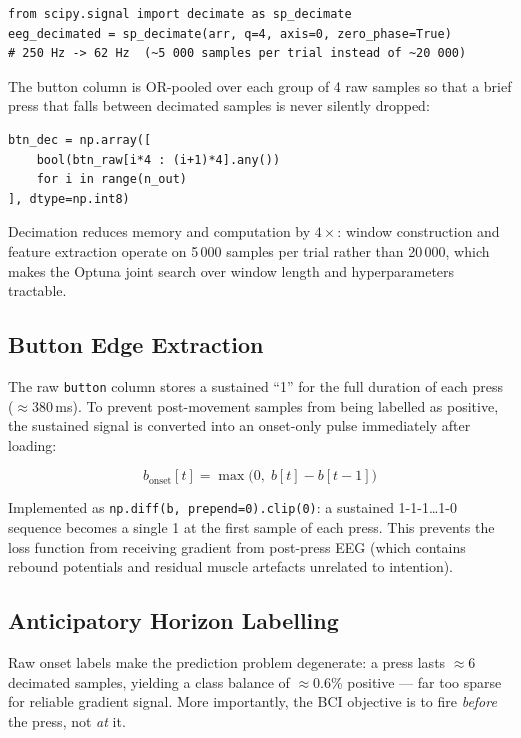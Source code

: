 \documentclass[12pt,a4paper]{article}
\begin{document}
\begin{lstlisting}[style=pycode]
from scipy.signal import decimate as sp_decimate
eeg_decimated = sp_decimate(arr, q=4, axis=0, zero_phase=True)
# 250 Hz -> 62 Hz  (~5 000 samples per trial instead of ~20 000)
\end{lstlisting}

The button column is OR-pooled over each group of 4 raw samples so that a
brief press that falls between decimated samples is never silently dropped:

\begin{lstlisting}[style=pycode]
btn_dec = np.array([
    bool(btn_raw[i*4 : (i+1)*4].any())
    for i in range(n_out)
], dtype=np.int8)
\end{lstlisting}

Decimation reduces memory and computation by $4\times$: window construction
and feature extraction operate on 5\,000 samples per trial rather than
20\,000, which makes the Optuna joint search over window length and
hyperparameters tractable.

\subsection{Button Edge Extraction}

The raw \texttt{button} column stores a sustained ``1'' for the full
duration of each press ($\approx$380\,ms). To prevent post-movement samples
from being labelled as positive, the sustained signal is converted into an
onset-only pulse immediately after loading:

\[
  b_{\text{onset}}[t] = \max\!\bigl(0,\; b[t] - b[t-1]\bigr)
\]

Implemented as \texttt{np.diff(b, prepend=0).clip(0)}: a sustained
1-1-1\ldots1-0 sequence becomes a single 1 at the first sample of each
press. This prevents the loss function from receiving gradient from
post-press EEG (which contains rebound potentials and residual muscle
artefacts unrelated to intention).

\subsection{Anticipatory Horizon Labelling}
\label{sec:horizon}

Raw onset labels make the prediction problem degenerate: a press lasts
$\approx$6 decimated samples, yielding a class balance of $\approx$0.6\%
positive — far too sparse for reliable gradient signal. More importantly,
the BCI objective is to fire \emph{before} the press, not \emph{at} it.
\end{document}
